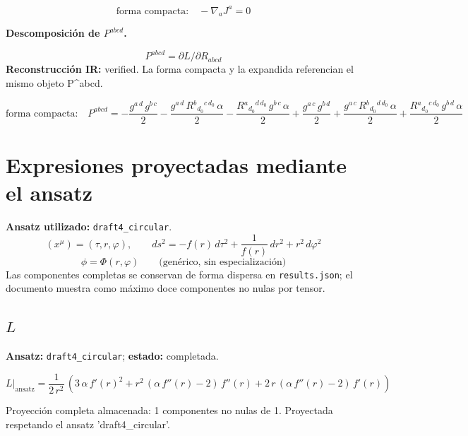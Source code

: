 \documentclass[11pt]{article}
\begin{document}
\begin{dmath*}[breakdepth={5}]
\text{forma compacta:}\quad -\nabla_a J^a = 0
\end{dmath*}
\par\medskip\noindent\textbf{Descomposición de $ P^{abcd} $.}\par
\begin{dmath*}[breakdepth={5}]
P^{abcd}=\partial L/\partial R_{abcd}
\end{dmath*}
\textbf{Reconstrucción IR:} verified. La forma compacta y la expandida referencian el mismo objeto P^{abcd}.\par
\begin{dmath*}[breakdepth={5}]
\text{forma compacta:}\quad P^{abcd} = -\frac{g{}^{a\,d}\,g{}^{b\,c}}{2} - \frac{g{}^{a\,d}\,R{}^{b}{}_{d_{0}}{}^{c\,d_{0}}\,\alpha}{2} - \frac{R{}^{a}{}_{d_{0}}{}^{d\,d_{0}}\,g{}^{b\,c}\,\alpha}{2} + \frac{g{}^{a\,c}\,g{}^{b\,d}}{2} + \frac{g{}^{a\,c}\,R{}^{b}{}_{d_{0}}{}^{d\,d_{0}}\,\alpha}{2} + \frac{R{}^{a}{}_{d_{0}}{}^{c\,d_{0}}\,g{}^{b\,d}\,\alpha}{2}
\end{dmath*}
\section*{Expresiones proyectadas mediante el ansatz}
\textbf{Ansatz utilizado:} \texttt{draft4\_circular}.
\begin{dmath*}[breakdepth={3}]
(x^\mu)=\left(\tau, r, \varphi\right),\qquad ds^2 = -f\!\left(r\right)\,d\tau^2 + \frac{1}{f\!\left(r\right)}\,dr^2 + {r}^{2}\,d\varphi^2
\end{dmath*}
\begin{dmath*}[breakdepth={3}]
\phi = \Phi\!\left(r, \varphi\right)\qquad\text{(genérico, sin especialización)}
\end{dmath*}
Las componentes completas se conservan de forma dispersa en \texttt{results.json}; el documento muestra como máximo doce componentes no nulas por tensor.
\subsection*{$ L $}
\textbf{Ansatz:} \texttt{draft4\_circular}; \textbf{estado:} completada.\par
\begin{dmath*}[breakdepth={5}]
L\big|_{\mathrm{ansatz}} = \frac{1}{2\,{r}^{2}}\,\left(3\,\alpha\,{f'\!\left(r\right)}^{2} + {r}^{2}\,\left(\alpha\,f''\!\left(r\right) - 2\right)\,f''\!\left(r\right) + 2\,r\,\left(\alpha\,f''\!\left(r\right) - 2\right)\,f'\!\left(r\right)\right)
\end{dmath*}
\par\smallskip
Proyección completa almacenada: 1 componentes no nulas de 1. Proyectada respetando el ansatz 'draft4\_circular'.\par\medskip
{}
\end{document}
